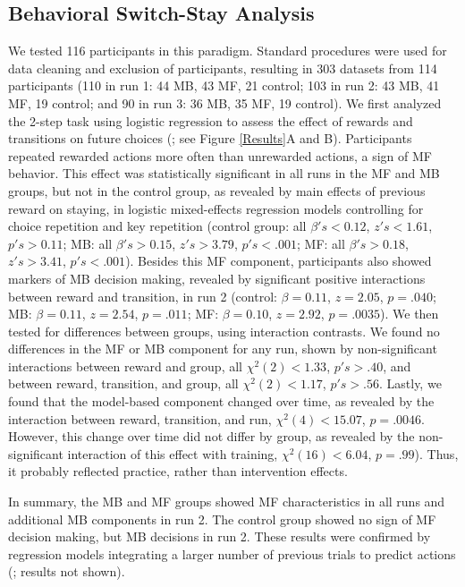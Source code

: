 \documentclass[11pt]{article} %
\begin{document}
\subsection{Behavioral Switch-Stay Analysis}
We tested 116 participants in this paradigm. Standard procedures were used for data cleaning and exclusion of participants, resulting in 303 datasets from 114 participants (110 in run 1: 44 MB, 43 MF, 21 control; 103 in run 2: 43 MB, 41 MF, 19 control; and 90 in run 3: 36 MB, 35 MF, 19 control). We first analyzed the 2-step task using logistic regression to assess the effect of rewards and transitions on future choices (\cite{akam_simple_2015}; see Figure \ref{Results}A and B). Participants repeated rewarded actions more often than unrewarded actions, a sign of MF behavior. This effect was statistically significant in all runs in the MF and MB groups, but not in the control group, as revealed by main effects of previous reward on staying, in logistic mixed-effects regression models controlling for choice repetition and key repetition (control group: all $\beta's < 0.12$, $z's < 1.61$, $p's > 0.11$; MB: all $\beta's > 0.15$, $z's > 3.79$, $p's < .001$; MF: all $\beta's > 0.18$, $z's > 3.41$, $p's < .001$). Besides this MF component, participants also showed markers of MB decision making, revealed by significant positive interactions between reward and transition, in run 2 (control: $\beta = 0.11$, $z = 2.05$, $p = .040$; MB: $\beta = 0.11$, $z = 2.54$, $p = .011$; MF: $\beta = 0.10$, $z = 2.92$, $p = .0035$). We then tested for differences between groups, using interaction contrasts. We found no differences in the MF or MB component for any run, shown by non-significant interactions between reward and group, all $\chi^{2}(2) < 1.33$, $p's > .40$, and between reward, transition, and group, all $\chi^{2}(2) < 1.17$, $p's > .56$. Lastly, we found that the model-based component changed over time, as revealed by the interaction between reward, transition, and run, $\chi^{2}(4) < 15.07$, $p = .0046$. However, this change over time did not differ by group, as revealed by the non-significant interaction of this effect with training, $\chi^{2}(16) < 6.04$, $p = .99$). Thus, it probably reflected practice, rather than intervention effects.  %

In summary, the MB and MF groups showed MF characteristics in all runs and additional MB components in run 2. The control group showed no sign of MF decision making, but MB decisions in run 2. These results were confirmed by regression models integrating a larger number of previous trials to predict actions (\cite{akam_simple_2015}; results not shown).
\end{document}
